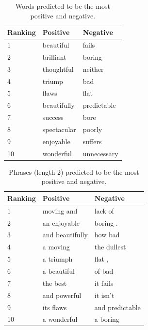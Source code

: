 \documentclass{article}
\newcommand{\ra}[1]{\renewcommand{\arraystretch}{#1}}
\begin{document}
\begin{table}[t]
    \centering

    \caption{Words predicted to be the most positive and negative.} 
    \label{tab:words}

    \ra{1.2}
    \begin{tabular}{@{} l l l @{}}
        \\
        \toprule
        \bf{Ranking} & \bf{Positive} & \bf{Negative} \\
        \midrule
        1 & beautiful   & fails  \\
        2 & brilliant   & boring \\
        3 & thoughtful  & neither\\
        4 & triump      & bad \\
        5 & flaws       & flat \\
        6 & beautifully & predictable \\
        7 & success     & bore \\
        8 & spectacular & poorly \\
        9 & enjoyable   & suffers \\
        10 & wonderful  & unnecessary \\
        \bottomrule
    \end{tabular}
\end{table}


\begin{table}[t]
    \centering

    \caption{Phrases (length 2) predicted to be the most positive and negative.} 
    \label{tab:phrases}

    \ra{1.2}
    \begin{tabular}{@{} l l l @{}}
        \\
        \toprule
        \bf{Ranking} & \bf{Positive} & \bf{Negative} \\
        \midrule
        1 & moving and      & lack of \\
        2 & an enjoyable    & boring .\\
        3 & and beautifully & how bad \\
        4 & a moving        & the dullest \\
        5 & a triumph       & flat , \\
        6 & a beautiful     & of bad \\
        7 & the best        & it fails \\
        8 & and powerful    & it isn't \\
        9 & its flaws       & and predictable \\
        10 & a wonderful    & a boring \\
        \bottomrule
    \end{tabular}
\end{table}
\end{document}
